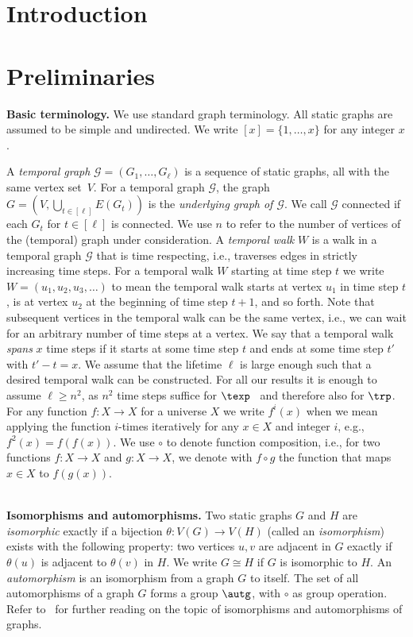 \section{Introduction}
\label{sec:int}



\section{Preliminaries}
\label{sec:pre}

\textbf{Basic terminology.} We use standard graph terminology. All static graphs
are assumed to be simple and undirected. We write $[x]=\{1, \ldots, x\}$ for any
integer $x$.

A \textit{temporal graph} $\mathcal{G}=(G_1, \ldots, G_{\ell})$ is a sequence of
static graphs, all with the same vertex set~$V$. For a temporal graph
$\mathcal{G}$, the graph $G=(V, \bigcup_{t \in [\ell]} E(G_t))$ is the
\textit{underlying graph of $\mathcal{G}$}. We call $\mathcal{G}$ connected if
each $G_t$ for $t\in [\ell]$ is connected. We use $n$ to refer to the number of
vertices of the (temporal) graph under consideration. A \textit{temporal walk}
$W$ is a walk in a temporal graph $\mathcal{G}$ that is time respecting, i.e.,
traverses edges in strictly increasing time steps. For a temporal walk $W$
starting at time step $t$ we write $W=(u_1, u_2, u_3, \ldots)$ to mean the
temporal walk starts at vertex $u_1$ in time step $t$, {is at vertex $u_2$
at the beginning of time step $t+1$,} and so forth. Note that subsequent
vertices in the temporal walk can be the same vertex, i.e., we can wait for an
arbitrary number of time steps at a vertex. We say that a temporal walk
\emph{spans} $x$ time steps if it starts at some time step $t$ and ends at some
time step $t'$ with $t'-t=x$. 
We assume that the lifetime $\ell$ is large enough
such that a desired temporal walk can be constructed. {For all our results
it is enough to assume $\ell \ge n^2$, as $n^2$ time steps suffice for
$\texp$~\cite{ErlebachHK21} and therefore also for $\trp$.} For any function $f:
X \rightarrow X$ for a universe $X$ we write $f^i(x)$ when we mean applying the
function $i$-times iteratively for any $x \in X$ and integer $i$, e.g.,
$f^2(x)=f(f(x))$. {We use $\circ$ to denote function composition, i.e.,}
for two functions $f: X \rightarrow X$ and $g: X \rightarrow X$, we denote with
$f \circ g$ the function that maps $x\in X$ to $f(g(x))$.


~\\ \noindent \textbf{Isomorphisms and automorphisms.} Two static graphs $G$ and $H$ are
\textit{isomorphic} exactly if a bijection $\theta: V(G) \rightarrow V(H)$
(called an \textit{isomorphism}) exists with the following property: two
vertices $u, v$ are adjacent in $G$ exactly if $\theta(u)$ is adjacent to
$\theta(v)$ in $H$. We write $G\cong H$ if $G$ is isomorphic to $H$. An
\textit{automorphism} is an isomorphism from a graph $G$ to itself. The set of
all automorphisms of a graph $G$ {forms a group $\autg$, with $\circ$ as
group operation.} Refer to~\cite{GodsilR01,KnauerK19,LauriS16} for further reading on the topic
of isomorphisms and automorphisms of graphs.

